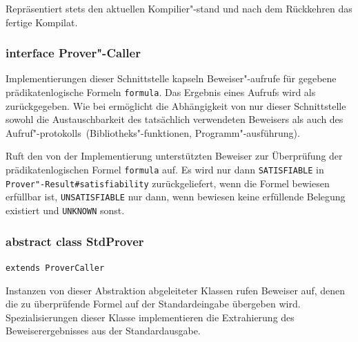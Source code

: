 \begin{description}%

    Repräsentiert stets den aktuellen Kompilier"-stand und nach dem
    Rückkehren das fertige Kompilat.%

\end{description}%

\subsubsection{interface Prover"-Caller}%

Implementierungen dieser Schnittstelle kapseln Beweiser"-aufrufe für
gegebene prädikatenlogische Formeln \texttt{formula}. Das Ergebnis
eines Aufrufs wird als  zurückgegeben. Wie bei
 ermöglicht die Abhängigkeit von nur dieser
Schnittstelle sowohl die Austauschbarkeit des tatsächlich verwendeten
Beweisers als auch des Aufruf"-protokolls~(Bibliotheks"-funktionen,
Programm"-ausführung).%

\begin{description}%

    Ruft den von der Implementierung unterstützten Beweiser zur Überprüfung der
    prädikatenlogischen Formel \texttt{formula} auf. Es wird nur dann
    \texttt{SATISFIABLE} in \texttt{Prover"-Result\#satisfiability}
    zurückgeliefert, wenn die Formel bewiesen erfüllbar ist,
    \texttt{UNSATISFIABLE} nur dann, wenn bewiesen keine erfüllende
    Belegung existiert und \texttt{UNKNOWN} sonst.

\end{description}%

\subsubsection{abstract class StdProver}%

\texttt{extends ProverCaller}%

Instanzen von dieser Abstraktion abgeleiteter Klassen rufen Beweiser
auf, denen die zu überprüfende Formel auf der Standardeingabe
übergeben wird. Spezialisierungen dieser Klasse implementieren die
Extrahierung des Beweiserergebnisses aus der Standardausgabe.%


\begin{description}%


\end{description}%

